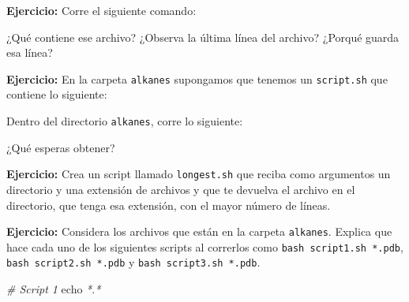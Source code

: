 \documentclass[
]{book}
\newenvironment{Shaded}{\begin{snugshade}}{\end{snugshade}}
\newcommand{\AttributeTok}[1]{\textcolor[rgb]{0.13,0.29,0.53}{#1}}
\newcommand{\BuiltInTok}[1]{#1}
\newcommand{\CommentTok}[1]{\textcolor[rgb]{0.56,0.35,0.01}{\textit{#1}}}
\newcommand{\ExtensionTok}[1]{#1}
\newcommand{\FunctionTok}[1]{\textcolor[rgb]{0.13,0.29,0.53}{\textbf{#1}}}
\newcommand{\KeywordTok}[1]{\textcolor[rgb]{0.13,0.29,0.53}{\textbf{#1}}}
\newcommand{\NormalTok}[1]{#1}
\newcommand{\OperatorTok}[1]{\textcolor[rgb]{0.81,0.36,0.00}{\textbf{#1}}}
\newcommand{\PreprocessorTok}[1]{\textcolor[rgb]{0.56,0.35,0.01}{\textit{#1}}}
\newcommand{\StringTok}[1]{\textcolor[rgb]{0.31,0.60,0.02}{#1}}
\newcommand{\VariableTok}[1]{\textcolor[rgb]{0.00,0.00,0.00}{#1}}
\begin{document}
\textbf{Ejercicio:} Corre el siguiente comando:

\begin{Shaded}
\end{Shaded}

¿Qué contiene ese archivo? ¿Observa la última línea del archivo? ¿Porqué guarda esa línea?

\textbf{Ejercicio:} En la carpeta \texttt{alkanes} supongamos que tenemos un \texttt{script.sh} que contiene lo siguiente:

\begin{Shaded}
\end{Shaded}

Dentro del directorio \texttt{alkanes}, corre lo siguiente:

\begin{Shaded}
\end{Shaded}

¿Qué esperas obtener?

\textbf{Ejercicio:} Crea un script llamado \texttt{longest.sh} que reciba como argumentos un directorio y una extensión de archivos y que te devuelva el archivo en el directorio, que tenga esa extensión, con el mayor número de líneas.

\textbf{Ejercicio:} Considera los archivos que están en la carpeta \texttt{alkanes}. Explica que hace cada uno de los siguientes scripts al correrlos como \texttt{bash\ script1.sh\ *.pdb}, \texttt{bash\ script2.sh\ *.pdb} y \texttt{bash\ script3.sh\ *.pdb}.

\begin{Shaded}
\begin{Highlighting}[]
\CommentTok{\# Script 1}
\BuiltInTok{echo} \PreprocessorTok{*}\NormalTok{.}\PreprocessorTok{*}
\end{Highlighting}
\end{Shaded}
\end{document}
